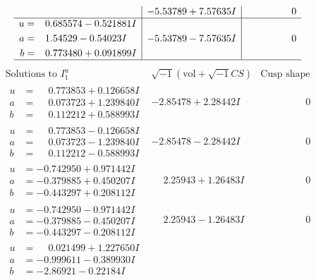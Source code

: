 \documentclass[1p]{elsarticle_modified}
\theoremstyle{definition}
\newcommand{\I}{\sqrt{-1}}
\begin{document}
$$\begin{array}{c|c|c}
 & -5.53789 + 7.57635 I & \phantom{-0.000000 } 0 \\ \hline\begin{aligned}
u &= \phantom{-}0.685574 - 0.521881 I \\
a &= \phantom{-}1.54529 - 0.54023 I \\
b &= \phantom{-}0.773480 + 0.091899 I\end{aligned}
 & -5.53789 - 7.57635 I & \phantom{-0.000000 } 0\\
 \hline 
 \end{array}$$\newpage$$\begin{array}{c|c|c}  
\text{Solutions to }I^u_{1}& \I (\text{vol} + \sqrt{-1}CS) & \text{Cusp shape}\\
 \hline 
\begin{aligned}
u &= \phantom{-}0.773853 + 0.126658 I \\
a &= \phantom{-}0.073723 + 1.239840 I \\
b &= \phantom{-}0.112212 + 0.588993 I\end{aligned}
 & -2.85478 + 2.28442 I & \phantom{-0.000000 } 0 \\ \hline\begin{aligned}
u &= \phantom{-}0.773853 - 0.126658 I \\
a &= \phantom{-}0.073723 - 1.239840 I \\
b &= \phantom{-}0.112212 - 0.588993 I\end{aligned}
 & -2.85478 - 2.28442 I & \phantom{-0.000000 } 0 \\ \hline\begin{aligned}
u &= -0.742950 + 0.971442 I \\
a &= -0.379885 + 0.450207 I \\
b &= -0.443297 + 0.208112 I\end{aligned}
 & \phantom{-}2.25943 + 1.26483 I & \phantom{-0.000000 } 0 \\ \hline\begin{aligned}
u &= -0.742950 - 0.971442 I \\
a &= -0.379885 - 0.450207 I \\
b &= -0.443297 - 0.208112 I\end{aligned}
 & \phantom{-}2.25943 - 1.26483 I & \phantom{-0.000000 } 0 \\ \hline\begin{aligned}
u &= \phantom{-}0.021499 + 1.227650 I \\
a &= -0.999611 - 0.389930 I \\
b &= -2.86921 - 0.22184 I\end{aligned}

\end{array}$$
\end{document}
